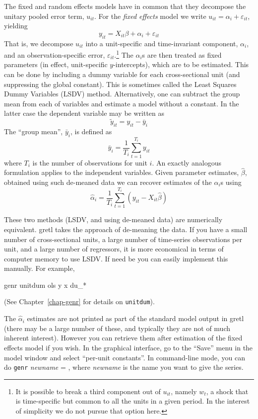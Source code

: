 The fixed and random effects models have in common that they decompose
the unitary pooled error term, $u_{it}$.  For the \textsl{fixed effects}
model we write $u_{it} = \alpha_i + \varepsilon_{it}$, yielding
\begin{equation}
\label{eq:FE}
y_{it} = X_{it}\beta + \alpha_i + \varepsilon_{it}
\end{equation}
That is, we decompose $u_{it}$ into a unit-specific and time-invariant
component, $\alpha_i$, and an observation-specific error,
$\varepsilon_{it}$.\footnote{It is possible to break a third component
  out of $u_{it}$, namely $w_t$, a shock that is time-specific but
  common to all the units in a given period.  In the interest of
  simplicity we do not pursue that option here.}  The $\alpha_i$s are
then treated as fixed parameters (in effect, unit-specific
$y$-intercepts), which are to be estimated.  This can be done by
including a dummy variable for each cross-sectional unit (and
suppressing the global constant).  This is sometimes called the Least
Squares Dummy Variables (LSDV) method.  Alternatively, one can subtract
the group mean from each of variables and estimate a model without a
constant.  In the latter case the dependent variable may be written as
\[
\tilde{y}_{it} = y_{it} - \bar{y}_i
\]
The ``group mean'', $\bar{y}_i$, is defined as
\[
\bar{y}_i = \frac{1}{T_i} \sum_{t=1}^{T_i} y_{it}
\]
where $T_i$ is the number of observations for unit $i$.  An exactly
analogous formulation applies to the independent variables.  Given
parameter estimates, $\hat{\beta}$, obtained using such de-meaned data
we can recover estimates of the $\alpha_i$s using
\[
\hat{\alpha}_i = \frac{1}{T_i} \sum_{t=1}^{T_i} 
   \left(y_{it} - X_{it}\hat{\beta}\right)
\]

These two methods (LSDV, and using de-meaned data) are numerically
equivalent. gretl takes the approach of de-meaning the data.  If
you have a small number of cross-sectional units, a large number of
time-series observations per unit, and a large number of regressors,
it is more economical in terms of computer memory to use LSDV.  If 
need be you can easily implement this manually.  For example,
%
\begin{code}
genr unitdum
ols y x du_*
\end{code}
%
(See Chapter~\ref{chap-genr} for details on \texttt{unitdum}).

The $\hat{\alpha}_i$ estimates are not printed as part of the standard
model output in gretl (there may be a large number of these, and
typically they are not of much inherent interest).  However you can
retrieve them after estimation of the fixed effects model if you
wish.  In the graphical interface, go to the ``Save'' menu in the
model window and select ``per-unit constants''.  In command-line mode,
you can do \texttt{genr} \textsl{newname} = , where
\textsl{newname} is the name you want to give the series. 

